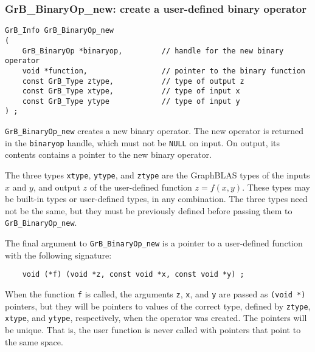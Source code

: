 \documentclass[12pt]{article}
\begin{document}
\newpage
\subsubsection{{\sf GrB\_BinaryOp\_new:} create a user-defined binary operator}
\label{binaryop_new}

\begin{mdframed}[userdefinedwidth=6in]
{\footnotesize
\begin{verbatim}
GrB_Info GrB_BinaryOp_new
(
    GrB_BinaryOp *binaryop,         // handle for the new binary operator
    void *function,                 // pointer to the binary function
    const GrB_Type ztype,           // type of output z
    const GrB_Type xtype,           // type of input x
    const GrB_Type ytype            // type of input y
) ;
\end{verbatim}
}\end{mdframed}

\verb'GrB_BinaryOp_new' creates a new binary operator.  The new operator is
returned in the \verb'binaryop' handle, which must not be \verb'NULL' on input.
On output, its contents contains a pointer to the new binary operator.

The three types \verb'xtype', \verb'ytype', and \verb'ztype' are the GraphBLAS
types of the inputs $x$ and $y$, and output $z$ of the user-defined function
$z=f(x,y)$.  These types may be built-in types or user-defined types, in any
combination.  The three types need not be the same, but they must be previously
defined before passing them to \verb'GrB_BinaryOp_new'.

The final argument to \verb'GrB_BinaryOp_new' is a pointer to a user-defined
function with the following signature:

    {\footnotesize
    \begin{verbatim}
    void (*f) (void *z, const void *x, const void *y) ; \end{verbatim} }

When the function \verb'f' is called, the arguments \verb'z', \verb'x', and
\verb'y' are passed as \verb'(void *)' pointers, but they will be pointers to
values of the correct type, defined by \verb'ztype', \verb'xtype', and
\verb'ytype', respectively, when the operator was created.  The pointers will
be unique.  That is, the user function is never called with pointers that point
to the same space.
\end{document}
